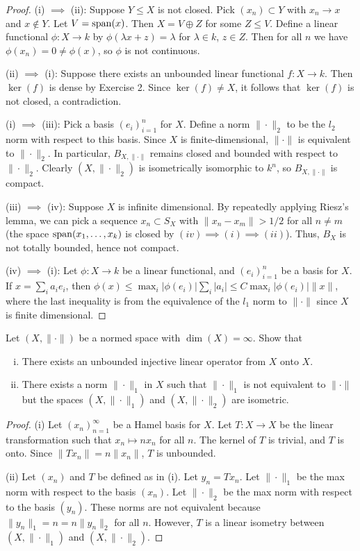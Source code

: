 \documentclass{article}
\begin{document}
\begin{proof}
(i) $\implies$ (ii):  Suppose $Y \le X$ is not closed. Pick $(x_n) \subset Y$ with $x_n \to x$ and $x \not\in Y$. Let $V = \operatorname{span}(x)$. Then $X = V \oplus Z$ for some $Z \le V$.  Define a linear functional $\phi: X \to k$ by $\phi(\lambda x + z) = \lambda$ for $\lambda \in k$, $z \in Z$.   Then for all $n$ we have $\phi(x_n) = 0 \neq \phi(x)$, so $\phi$ is not continuous.

(ii) $\implies$ (i): Suppose there exists an unbounded linear functional $f: X \to k$. Then $\ker(f)$ is dense by Exercise 2.  Since $\ker(f) \neq X$, it follows that $\ker(f)$ is not closed, a contradiction.

(i) $\implies$ (iii): Pick a basis $(e_i)_{i=1}^n$ for $X$.  Define a norm $\|\cdot\|_2$ to be the $l_2$ norm with respect to this basis.  Since $X$ is finite-dimensional, $\|\cdot\|$ is equivalent to $\|\cdot\|_2$.  In particular, $B_{X,\|\cdot\|}$ remains closed and bounded with respect to $\|\cdot\|_2$.  Clearly $(X, \|\cdot\|_2)$ is isometrically isomorphic to $k^n$, so $B_{X,\|\cdot\|}$ is compact.

(iii) $\implies$ (iv):  Suppose $X$ is infinite dimensional. By repeatedly applying Riesz's lemma, we can pick a sequence $x_n \subset S_X$ with $\|x_n - x_m\| > 1/2$ for all $n \neq m$  (the space $\operatorname{span}(x_1, \ldots, x_k)$ is closed by $(iv) \implies (i) \implies (ii)$). Thus, $B_X$ is not totally bounded, hence not compact.

(iv) $\implies$ (i): Let $\phi: X \to k$ be a linear functional, and $(e_i)_{i=1}^n$ be a basis for $X$.  If $x = \sum_i a_i e_i$, then $\phi(x) \le \max_i |\phi(e_i)| \sum_i |a_i| \le C \max_i |\phi(e_i)|  \|x\|$, where the last inequality is from the equivalence of the $l_1$ norm to $\| \cdot \|$ since $X$ is finite dimensional.
\end{proof}

 Let $(X, \| \cdot \|)$ be a normed space with $\dim(X) = \infty$. Show that
\begin{enumerate}[(i)]
\item There exists an unbounded injective linear operator from $X$ onto $X$.
\item There exists a norm $\| \cdot \|_1$ in $X$ such that $\|\cdot \|_1$ is not equivalent to $\| \cdot \|$ but the spaces $(X, \| \cdot \|_1)$ and $(X, \| \cdot \|_2)$ are isometric.
\end{enumerate}
\begin{proof}
(i) Let $(x_n)_{n=1}^\infty$ be a Hamel basis for $X$. Let $T: X \to X$ be the linear transformation such that $x_n \mapsto n x_n$ for all $n$. The kernel of $T$ is trivial, and $T$ is onto.  Since $\|Tx_n\| = n \|x_n\|$, $T$ is unbounded.

(ii) Let $(x_n)$ and $T$ be defined as in (i).  Let $y_n = Tx_n$.  Let $\|\cdot\|_1$ be the max norm with respect to the basis $(x_n)$.  Let $\|\cdot\|_2$ be the max norm with respect to the basis $(y_n)$. These norms are not equivalent because $\|y_n\|_1 = n = n \|y_n\|_2$ for all $n$.  However, $T$ is a linear isometry between $(X, \| \cdot \|_1)$ and $(X, \| \cdot \|_2)$.
\end{proof}
\end{document}
